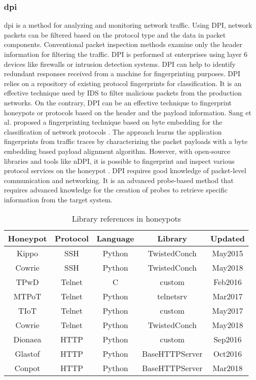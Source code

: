 \subsubsection{\acrfull{dpi}}
\acrfull{dpi}  is a method for analyzing and monitoring network traffic. Using DPI, network packets can be filtered based on the protocol type and the data in packet components. Conventional packet inspection methods examine only the header information for filtering the traffic. DPI is performed at enterprises using layer 6 devices like firewalls or intrusion detection systems. DPI can help to identify redundant responses received from a machine for fingerprinting purposes. DPI relies on a repository of existing protocol fingerprints for classification. It is an effective technique used by IDS to filter malicious packets from the production networks. On the contrary, DPI can be an effective technique to fingerprint honeypots or protocols based on the header and the payload information. Sang et al. proposed a fingerprinting technique based on byte embedding for the classification of network protocols \cite{Sang}. The approach learns the application fingerprints from traffic traces by characterizing the packet payloads with a byte embedding based payload alignment algorithm. However, with open-source libraries and tools like nDPI, it is possible to fingerprint and inspect various protocol services on the honeypot \cite{nDPI}. DPI requires good knowledge of packet-level communication and networking. It is an advanced probe-based method that requires advanced knowledge for the creation of probes to retrieve specific information from the target system.  


\begin{table}
\begin{tabular}{||c c c c c||} 
 \hline
 Honeypot & Protocol & Language & Library & Updated \\ [0.5ex] 
 \hline
 Kippo  & SSH    & Python &  TwistedConch & May2015 \\ 
 Cowrie & SSH    & Python &  TwistedConch & May2018 \\
 TPwD   & Telnet & C      &  custom       & Feb2016 \\
 MTPoT  & Telnet & Python &  telnetsrv    & Mar2017 \\
 TIoT   & Telnet & Python &  custom       & May2017 \\
 Cowrie & Telnet & Python &  TwistedConch & May2018 \\
 Dionaea& HTTP   & Python &  custom       & Sep2016 \\
 Glastof& HTTP   & Python &  BaseHTTPServer& Oct2016 \\
 Conpot & HTTP   & Python &  BaseHTTPServer& Mar2018 \\ [1ex] 
 \hline
\end{tabular}
\caption{Library references in honeypots}
\label{library}
\end{table}



